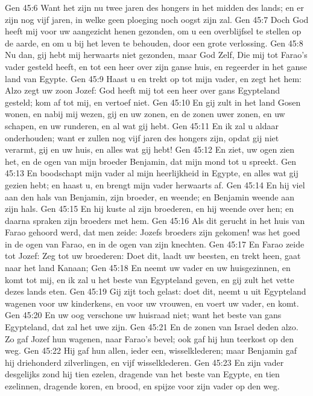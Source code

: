 Gen 45:6  Want het zijn nu twee jaren des hongers in het midden des lands; en er zijn nog vijf jaren, in welke geen ploeging noch oogst zijn zal.
Gen 45:7  Doch God heeft mij voor uw aangezicht henen gezonden, om u een overblijfsel te stellen op de aarde, en om u bij het leven te behouden, door een grote verlossing.
Gen 45:8  Nu dan, gij hebt mij herwaarts niet gezonden, maar God Zelf, Die mij tot Farao's vader gesteld heeft, en tot een heer over zijn ganse huis, en regeerder in het ganse land van Egypte.
Gen 45:9  Haast u en trekt op tot mijn vader, en zegt het hem: Alzo zegt uw zoon Jozef: God heeft mij tot een heer over gans Egypteland gesteld; kom af tot mij, en vertoef niet.
Gen 45:10  En gij zult in het land Gosen wonen, en nabij mij wezen, gij en uw zonen, en de zonen uwer zonen, en uw schapen, en uw runderen, en al wat gij hebt.
Gen 45:11  En ik zal u aldaar onderhouden; want er zullen nog vijf jaren des hongers zijn, opdat gij niet verarmt, gij en uw huis, en alles wat gij hebt!
Gen 45:12  En ziet, uw ogen zien het, en de ogen van mijn broeder Benjamin, dat mijn mond tot u spreekt.
Gen 45:13  En boodschapt mijn vader al mijn heerlijkheid in Egypte, en alles wat gij gezien hebt; en haast u, en brengt mijn vader herwaarts af.
Gen 45:14  En hij viel aan den hals van Benjamin, zijn broeder, en weende; en Benjamin weende aan zijn hals.
Gen 45:15  En hij kuste al zijn broederen, en hij weende over hen; en daarna spraken zijn broeders met hem.
Gen 45:16  Als dit gerucht in het huis van Farao gehoord werd, dat men zeide: Jozefs broeders zijn gekomen! was het goed in de ogen van Farao, en in de ogen van zijn knechten.
Gen 45:17  En Farao zeide tot Jozef: Zeg tot uw broederen: Doet dit, laadt uw beesten, en trekt heen, gaat naar het land Kanaan;
Gen 45:18  En neemt uw vader en uw huisgezinnen, en komt tot mij, en ik zal u het beste van Egypteland geven, en gij zult het vette dezes lands eten.
Gen 45:19  Gij zijt toch gelast: doet dit, neemt u uit Egypteland wagenen voor uw kinderkens, en voor uw vrouwen, en voert uw vader, en komt.
Gen 45:20  En uw oog verschone uw huisraad niet; want het beste van gans Egypteland, dat zal het uwe zijn.
Gen 45:21  En de zonen van Israel deden alzo. Zo gaf Jozef hun wagenen, naar Farao's bevel; ook gaf hij hun teerkost op den weg.
Gen 45:22  Hij gaf hun allen, ieder een, wisselklederen; maar Benjamin gaf hij driehonderd zilverlingen, en vijf wisselklederen.
Gen 45:23  En zijn vader desgelijks zond hij tien ezelen, dragende van het beste van Egypte, en tien ezelinnen, dragende koren, en brood, en spijze voor zijn vader op den weg.
